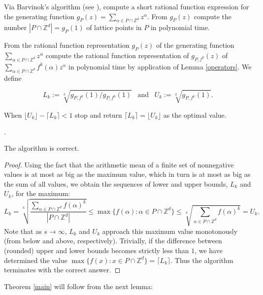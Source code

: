 \documentclass[twoside]{article}
\newcommand{\Z}{\mathbb Z}
\newcommand{\1}{{\bf 1}}
\begin{document}
 Via Barvinok's algorithm (see
\cite{bar,BarviPom,newbar}), compute a short rational function
expression for the generating function $g_P(z)=\sum_{\alpha\in
  P\cap\Z^d} z^\alpha$.  From $g_P(z)$ compute the number $|P \cap
\Z^d|=g_P(1)$ of lattice points in $P$ in polynomial time.

 From the rational function representation $ g_P(z)$ of the
generating function $\sum\limits_{\alpha\in P \cap \Z^d}
z^\alpha$ compute the rational function representation of
$g_{P,f^k}(z)$ of $\sum_{\alpha\in P \cap \Z^d} f^k(\alpha) z^\alpha$ in
polynomial time by application of Lemma \ref{operators}. We define

\[
L_k:=\sqrt[k]{g_{P,f^k}(1)/g_{P,f^0}(1)}\;\;\;\text{and}\;\;\;
U_k:=\sqrt[k]{g_{P,f^k}(1)}.
\]

When $\lfloor U_{k}\rfloor-\lceil L_{k}\rceil<1$  stop and return
$\lceil L_{k} \rceil=\lfloor U_{k} \rfloor$ as the optimal value.

.

\begin{lemma} The algorithm is correct. \end{lemma}

\begin{proof} Using the fact that the arithmetic mean of a finite set
  of nonnegative values is at most as big as the maximum value, which
  in turn is at most as big as the sum of all values, we obtain the
  sequences of lower and upper bounds, $L_{k}$ and $U_{k}$, for
  the maximum:
\[
L_{k}=
\sqrt[k]{\frac{\sum\limits_{\alpha\in P \cap \Z^d}
f(\alpha)^{k}}{|P\cap\Z^d|}} \leq
\max\{f(\alpha):\alpha\in P\cap\Z^d\}\leq
\sqrt[k]{\sum\limits_{\alpha\in P \cap \Z^d}
f(\alpha)^{k}}=U_{k}.
\]
Note that as $s\rightarrow\infty$, $L_{k}$ and $U_{k}$ approach
this maximum value monotonously (from below and above, respectively).
Trivially, if the difference between (rounded) upper and lower bounds
becomes strictly less than $1$, we have determined the value
$\max\{f(x):x\in P\cap\Z^d\}=\lceil L_{k}\rceil$. Thus the algorithm
terminates with the correct answer.
\end{proof}

Theorem \ref{main} will follow from the next lemma:
\end{document}
